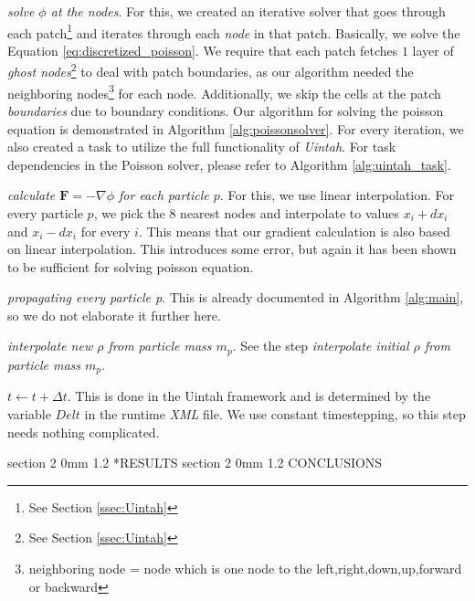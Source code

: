 \documentclass[notitlepage, 12pt]{article}
\makeatletter
\renewcommand{\section}{\@startsection       %
        {section}
        {2}
        {0mm}
        {1.2\baselineskip}
        {\baselineskip}
        {\centering\normalsize}}
\makeatother
\begin{document}
\emph{solve $\phi$ at the nodes}. For this, we created an iterative solver 
that goes through each patch\footnote{See Section \ref{ssec:Uintah}} and 
iterates through each \emph{node} in that patch. Basically, we solve 
the Equation \ref{eq:discretized_poisson}. We require that each patch 
fetches $1$ layer of \emph{ghost nodes}\footnote{See Section \ref{ssec:Uintah}} 
to deal with patch boundaries, as our algorithm needed the neighboring nodes\footnote{neighboring node = node which is one node to the left,right,down,up,forward or backward} 
for each node. Additionally, we skip the cells at the patch \emph{boundaries} due 
to boundary conditions. Our algorithm for solving the poisson 
equation is demonstrated in Algorithm \ref{alg:poissonsolver}. For every iteration, we also 
created a task to utilize the full functionality of \emph{Uintah}. For task dependencies in the Poisson solver, please refer to Algorithm 
\ref{alg:uintah_task}.

\emph{calculate $\mathbf{F}=-\nabla \phi$ for each particle $p$}. For this, 
we use linear interpolation. For every particle $p$, we pick the $8$ nearest 
nodes and interpolate to values $x_i+dx_i$ and $x_i-dx_i$ for every $i$. 
This means that our gradient calculation is also based on linear interpolation. 
This introduces some error, but again it has been shown to be sufficient 
for solving poisson equation\citep{linearinterpolation}.

\emph{propagating every particle p}. This is already documented in 
Algorithm \ref{alg:main}, so we do not elaborate it further here.

\emph{interpolate new $\rho$ from particle mass $m_p$}. See the step 
\emph{interpolate initial $\rho$ from particle mass $m_p$}.

\emph{$t \gets t + \Delta t$}. This is done in the Uintah framework 
and is determined by the variable $Delt$ in the runtime \emph{XML} file. 
We use constant timestepping, so this step needs nothing complicated.

\section*{RESULTS}
\section{CONCLUSIONS} \label{sec:conclusions}

%
\end{document}
